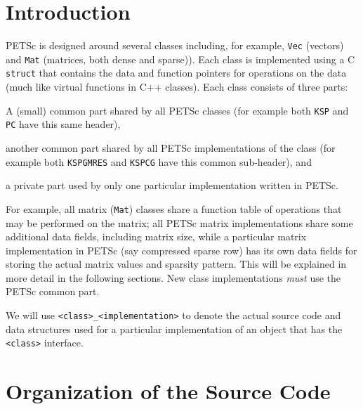\section{Introduction}

PETSc is designed around several classes including, for example, \lstinline{Vec} (vectors) and 
\lstinline{Mat} (matrices, both dense and sparse)). Each class is 
implemented using a C \lstinline{struct} that contains the data and function pointers
for operations on the data (much like virtual functions in C++ classes).
Each class consists of three parts:
\begin{tightenumerate}
  \item A (small) common part shared by all PETSc classes (for example both \lstinline{KSP} and \lstinline{PC} have this same header),
  \item another common part shared by all PETSc implementations of the class (for example both \lstinline{KSPGMRES} and \lstinline{KSPCG} have this common sub-header), and
  \item a private part used by only one particular implementation written in PETSc.
\end{tightenumerate}
For example, all matrix (\lstinline{Mat}) classes share a function table of operations that
may be performed on the matrix; all PETSc matrix implementations share some additional
data fields, including matrix size, while a particular matrix implementation in PETSc
(say compressed sparse row) has its own data fields for storing the actual
matrix values and sparsity pattern. This will be explained in more detail
in the following sections. New class implementations {\em must}
use the PETSc common part.


We will use \lstinline{<class>_<implementation>} to denote the actual source code and
data structures used for a particular implementation of an object that has the
\lstinline{<class>} interface.

\section{Organization of the Source Code}

